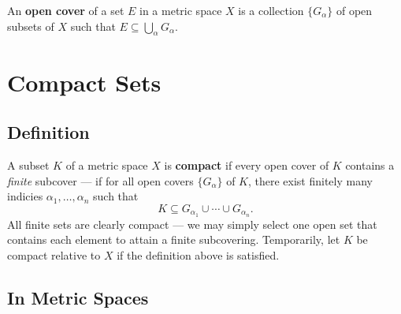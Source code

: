 \documentclass[11pt]{article}
\begin{document}
An \textbf{open cover} of a set $E$ in a metric space $X$ is a collection $\{ G_{\alpha} \}$ of open subsets of $X$ such that $E \subseteq \bigcup_{\alpha} G_{\alpha}$.


\section{Compact Sets}


\subsection{Definition}

A subset $K$ of a metric space $X$ is \textbf{compact} if every open cover of $K$ contains a \textit{finite} subcover --- if for all open covers $\{ G_{\alpha} \}$ of $K$, there exist finitely many indicies $\alpha_{1}, \ldots, \alpha_{n}$ such that
\[
	K \subseteq G_{\alpha_{1}} \cup \cdots \cup G_{\alpha_{n}}.
\]
All finite sets are clearly compact --- we may simply select one open set that contains each element to attain a finite subcovering. Temporarily, let $K$ be compact relative to $X$ if the definition above is satisfied.

\newpage

\subsection{In Metric Spaces}
\end{document}
